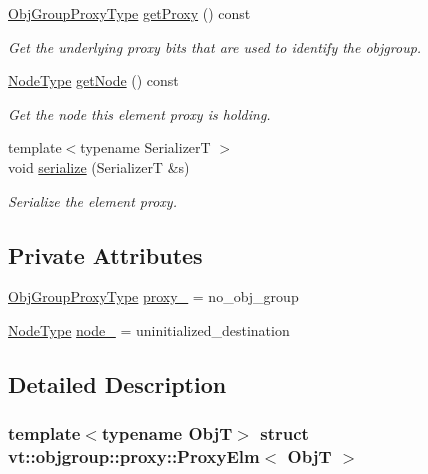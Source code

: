 \begin{DoxyCompactItemize}
\hyperlink{namespacevt_ad7cae989df485fccca57f0792a880a8e}{Obj\+Group\+Proxy\+Type} \hyperlink{structvt_1_1objgroup_1_1proxy_1_1_proxy_elm_ae7cbfe997421f265fa51cd29adc6957e}{get\+Proxy} () const
\begin{DoxyCompactList}\small\item\em Get the underlying proxy bits that are used to identify the objgroup. \end{DoxyCompactList}\item 
\hyperlink{namespacevt_a866da9d0efc19c0a1ce79e9e492f47e2}{Node\+Type} \hyperlink{structvt_1_1objgroup_1_1proxy_1_1_proxy_elm_a2a2067c00f4d5bc4b07dfb371f2f0d7a}{get\+Node} () const
\begin{DoxyCompactList}\small\item\em Get the node this element proxy is holding. \end{DoxyCompactList}\item 
{\footnotesize template$<$typename SerializerT $>$ }\\void \hyperlink{structvt_1_1objgroup_1_1proxy_1_1_proxy_elm_aa2c6be8bfa1113516cd6e8b3d7bd0445}{serialize} (SerializerT \&s)
\begin{DoxyCompactList}\small\item\em Serialize the element proxy. \end{DoxyCompactList}\end{DoxyCompactItemize}
\subsection*{Private Attributes}
\begin{DoxyCompactItemize}
\item 
\hyperlink{namespacevt_ad7cae989df485fccca57f0792a880a8e}{Obj\+Group\+Proxy\+Type} \hyperlink{structvt_1_1objgroup_1_1proxy_1_1_proxy_elm_ab8a57044d257ea520a080de9f3389ba5}{proxy\+\_\+} = no\+\_\+obj\+\_\+group
\item 
\hyperlink{namespacevt_a866da9d0efc19c0a1ce79e9e492f47e2}{Node\+Type} \hyperlink{structvt_1_1objgroup_1_1proxy_1_1_proxy_elm_a0655b033581faad1cab6bf7402e36aac}{node\+\_\+} = uninitialized\+\_\+destination
\end{DoxyCompactItemize}


\subsection{Detailed Description}
\subsubsection*{template$<$typename ObjT$>$\newline
struct vt\+::objgroup\+::proxy\+::\+Proxy\+Elm$<$ Obj\+T $>$}

